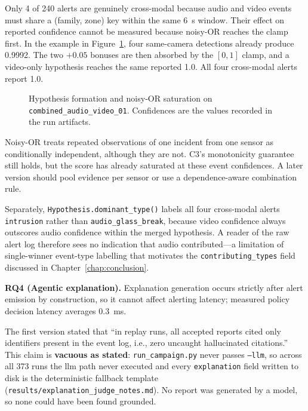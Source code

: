 Only 4 of 240 alerts are genuinely cross-modal because audio and video events must share a (family, zone) key within the same 6~s window. Their effect on reported confidence cannot be measured because noisy-OR reaches the clamp first. In the example in Figure~\ref{fig:fusion_timeline}, four same-camera detections already produce 0.9992. The two $+0.05$ bonuses are then absorbed by the $[0,1]$ clamp, and a video-only hypothesis reaches the same reported 1.0. All four cross-modal alerts report 1.0.

\begin{figure}[H]
	\centering
	\resizebox{\textwidth}{!}{}
	\caption{Hypothesis formation and noisy-OR saturation on \texttt{combined\_audio\_video\_01}. Confidences are the values recorded in the run artifacts.}
	\label{fig:fusion_timeline}
\end{figure}

Noisy-OR treats repeated observations of one incident from one sensor as conditionally independent, although they are not. C3's monotonicity guarantee still holds, but the score has already saturated at these event confidences. A later version should pool evidence per sensor or use a dependence-aware combination rule.

Separately, \texttt{Hypothesis.dominant\_type()} labels all four cross-modal alerts \texttt{intrusion} rather than \texttt{audio\_glass\_break}, because video confidence always outscores audio confidence within the merged hypothesis. A reader of the raw alert log therefore sees no indication that audio contributed---a limitation of single-winner event-type labelling that motivates the \texttt{contributing\_types} field discussed in Chapter~\ref{chap:conclusion}.

\textbf{RQ4 (Agentic explanation).}
\label{sec:rq4}
Explanation generation occurs strictly after alert emission by construction, so it cannot affect alerting latency; measured policy decision latency averages 0.3~ms.

\begin{revisionbox}
	The first version stated that ``in replay runs, all accepted reports cited only identifiers present in the event log, i.e., zero uncaught hallucinated citations.'' This claim is \textbf{vacuous as stated}: \texttt{run\_campaign.py} never passes \texttt{--llm}, so across all 373 runs the \gls{llm} path never executed and every \texttt{explanation} field written to disk is the deterministic fallback template (\texttt{results/explanation\_judge\_notes.md}). No report was generated by a model, so none could have been found grounded.
\end{revisionbox}


